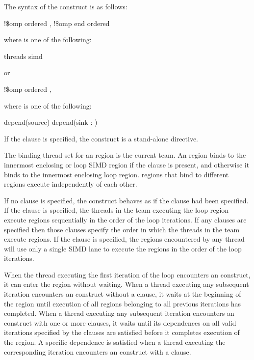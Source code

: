 \begin{fortranspecific}
The syntax of the  construct is as follows:

\begin{boxedcode}
!\$omp ordered \plc{[clause[ [},\plc{] clause] ]}
!\$omp end ordered
\end{boxedcode}

where  is one of the following:
\begin{indentedcodelist}
threads
simd
\end{indentedcodelist}

or

\begin{boxedcode}
!\$omp ordered \plc{clause [[[},\plc{] clause] ... ]}
\end{boxedcode}

where  is one of the following:
\begin{indentedcodelist}
depend(source)
depend(sink : )
\end{indentedcodelist}
\end{fortranspecific}

If the  clause is specified, the  construct is a stand-alone directive.
 
\binding
The binding thread set for an  region is the current team. An  region 
binds to the innermost enclosing  or loop SIMD region if the
 clause is present, and otherwise it binds to the innermost
enclosing loop region.  regions that bind to different regions
execute independently of each other.

\descr
If no clause is specified, the  construct behaves as if the
 clause had been specified. If the  clause is
specified, the threads in the team executing the loop region execute
 regions sequentially in the order of the loop iterations.
If any  clauses are specified then those clauses specify the 
order in which the threads in the team execute  regions. If
the  clause is specified, the  regions encountered by
any thread will use only a single SIMD lane to execute the 
regions in the order of the loop iterations.

When the thread executing the first iteration of the loop encounters an
 construct, it can enter the  region without
waiting. When a thread executing any subsequent iteration encounters an
 construct without a  clause, it waits at the
beginning of the  region until execution of all 
regions belonging to all previous iterations has completed. When a thread
executing any subsequent iteration encounters an  construct with
one or more  clauses, it waits until its dependences on 
all valid iterations specified by the  clauses
are satisfied before it completes execution of the  region.
A specific dependence is satisfied when a thread executing the corresponding
iteration encounters an  construct with a  clause.

